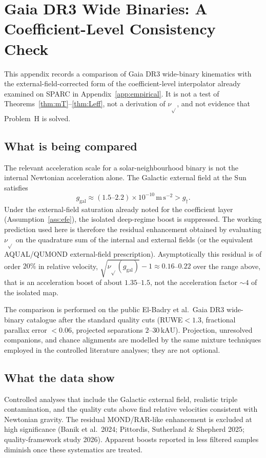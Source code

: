\chapter{Gaia DR3 Wide Binaries: A Coefficient-Level Consistency Check}
\label{app:gaia}

This appendix records a comparison of Gaia DR3 wide-binary kinematics
with the external-field-corrected form of the coefficient-level
interpolator already examined on SPARC in Appendix~\ref{app:empirical}.
It is not a test of Theorems~\ref{thm:mT}--\ref{thm:Leff}, not a
derivation of \(\nu_{\sqrt{}}\), and not evidence that Problem~H is
solved.

\section{What is being compared}
\label{sec:gaia-what}

The relevant acceleration scale for a solar-neighbourhood binary is
not the internal Newtonian acceleration alone. The Galactic external
field at the Sun satisfies
\[
  g_{\mathrm{gal}}\approx(1.5\text{--}2.2)\times 10^{-10}\,\mathrm{m\,s^{-2}}
  >g_\dagger.
\]
Under the external-field saturation already noted for the
coefficient layer (Assumption~\ref{ass:efe}), the isolated
deep-regime boost is suppressed. The working prediction used here is
therefore the residual enhancement obtained by evaluating
\(\nu_{\sqrt{}}\) on the quadrature sum of the internal and external
fields (or the equivalent AQUAL/QUMOND external-field prescription).
Asymptotically this residual is of order \(20\%\) in relative velocity,
\(\sqrt{\nu_{\sqrt{}}(g_{\mathrm{gal}})}-1\approx 0.16\)--\(0.22\) over the
range above, that is an acceleration boost of about \(1.35\)--\(1.5\),
not the acceleration factor \(\sim4\) of the isolated map.

The comparison is performed on the public El-Badry et al.\ Gaia DR3
wide-binary catalogue after the standard quality cuts
(RUWE\(<1.3\), fractional parallax error \(<0.06\), projected
separations \(2\)--\(30\,\mathrm{kAU}\)). Projection, unresolved
companions, and chance alignments are modelled by the same mixture
techniques employed in the controlled literature analyses; they are
not optional.

\section{What the data show}
\label{sec:gaia-show}

Controlled analyses that include the Galactic external field,
realistic triple contamination, and the quality cuts above find
relative velocities consistent with Newtonian gravity. The residual
MOND/RAR-like enhancement is excluded at high significance
(Banik et al.\ 2024; Pittordis, Sutherland \& Shepherd 2025;
quality-framework study 2026). Apparent boosts reported in less
filtered samples diminish once these systematics are treated.

